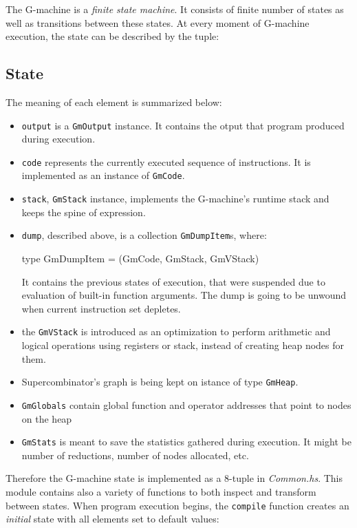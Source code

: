 \documentclass[12pt,a4paper]{report}
\begin{document}
The G-machine is a \textit{finite state machine}. It consists of finite number
of states as well as transitions between these states. At every moment of
G-machine execution, the state can be described by the tuple:

\subsection{State}
The meaning of each element is summarized below:
\begin{itemize}
  \item \texttt{output} is a \texttt{GmOutput} instance. It contains the otput
    that program produced during execution.
  \item \texttt{code} represents the currently executed sequence of
    instructions. It is implemented as an instance of \texttt{GmCode}.
  \item \texttt{stack}, \texttt{GmStack} instance, implements the G-machine's runtime
    stack and keeps the spine of expression.
  \item \texttt{dump}, described above, is a collection \texttt{GmDumpItem}s,
    where:

    \vspace*{0.2in}
    \begin{code}[style=haskell]
      type GmDumpItem = (GmCode, GmStack, GmVStack)
    \end{code}

    It contains the previous states of execution, that were suspended due to
    evaluation of built-in function arguments. The dump is going to be unwound
    when current instruction set depletes.
  \item the \texttt{GmVStack} is introduced as an optimization to perform
    arithmetic and logical operations using registers or stack, instead of creating
    heap nodes for them.
  \item Supercombinator's graph is being kept on istance of type
    \texttt{GmHeap}.
  \item \texttt{GmGlobals} contain global function and operator addresses that
    point to nodes on the heap
  \item \texttt{GmStats} is meant to save the statistics gathered during
    execution. It might be number of reductions, number of nodes allocated,
    etc.

\end{itemize}

Therefore the G-machine state is implemented as a 8-tuple in
\textit{Common.hs}. This module contains also a variety of functions to both
inspect and transform between states. When program execution begins, the
\texttt{compile} function creates an \textit{initial} state with all elements
set to default values:
\end{document}
